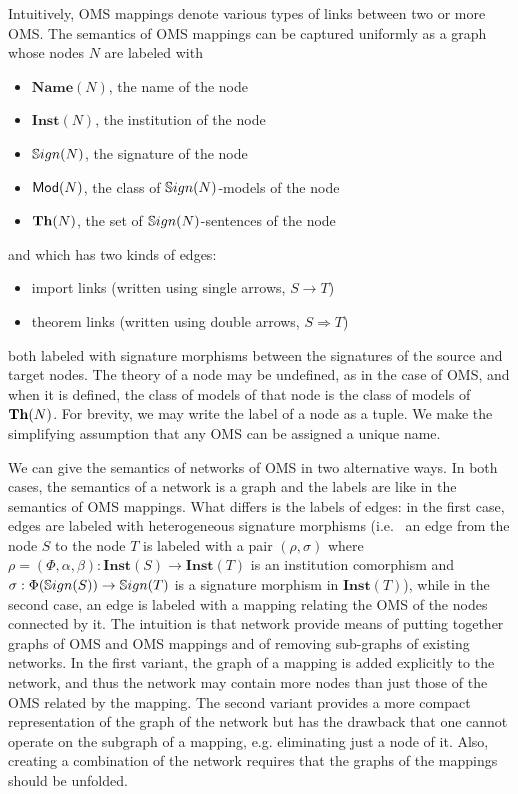\documentclass[10pt,fleqn,%
\ifpretendfinal
final%
\else
draft%
\fi,
]{scrreprt}
\newcommand{\Inst}{\ensuremath{\mathbf{Inst}}}
\newcommand{\Name}{\ensuremath{\mathbf{Name}}}
\begin{document}
Intuitively, OMS mappings denote various types of links between two or more OMS. 
The semantics of OMS mappings can be captured uniformly as a graph whose nodes $N$ are labeled with 
\begin{itemize}
 \item $\Name(N)$, the name of the node
 \item $\Inst(N)$, the institution of the node
 \item $\mathbb{S}ign(N)$, the signature of the node
 \item $\mathsf{Mod}(N)$, the class of $\mathbb{S}ign(N)$-models of the node
 \item $\mathbf{Th}(N)$, the set of $\mathbb{S}ign(N)$-sentences of the node
\end{itemize}
and 
which has two kinds of edges:
\begin{itemize}
  \item import links (written using single arrows, $S\rightarrow T$)
  \item theorem links (written using double arrows, $S\Rightarrow T$)
\end{itemize}
both labeled with signature morphisms between the signatures of the source and target nodes. 
The theory of a node  may be undefined, as in the case of OMS, and when it is defined, 
the class of models of that node is the class of models of $\mathbf{Th}(N)$. 
For brevity, we may write the label of a node as a tuple. We make the simplifying 
assumption that any OMS can be assigned a unique name.

We can give the semantics of networks of OMS in two alternative ways.
In both cases, the semantics of a network is a graph and the labels
are like in the semantics of OMS mappings. What differs is the labels of
edges: in the first case, edges are labeled with heterogeneous signature morphisms (i.e.~ 
an edge from the node $S$ to the node $T$ is labeled with a pair 
$(\rho, \sigma)$ where $\rho=(\Phi,\alpha,\beta):\Inst(S)\to\Inst(T)$ is an institution comorphism and
$\sigma:\Phi(\mathbb{S}ign(S))\to\mathbb{S}ign(T)$ is a signature morphism in $\Inst(T)$), 
while in the second case, an edge is labeled with a mapping
relating the OMS of the nodes connected by it. 
The intuition is that
network provide means of putting together graphs of OMS and OMS mappings
and of removing sub-graphs of existing networks. In the first 
variant, the graph of a mapping is added explicitly to the network, and
thus the network may contain more nodes than just those of the OMS
related by the mapping. The second variant provides a more compact
representation of the graph of the network but has the drawback that
one cannot operate on the subgraph of a mapping, e.g. eliminating just a 
node of it. Also, creating a combination of the 
network requires that the graphs of the mappings 
should be unfolded.
\end{document}
